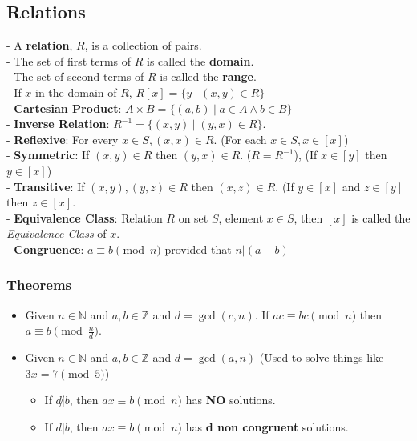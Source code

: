 \documentclass{article}
\newcommand\setbar{\hspace{3pt} \big| \hspace{3pt}}
\begin{document}
\begin{multicols}{3}
  \subsection*{Relations}
  - A \textbf{relation}, $R$, is a collection of pairs.\\
  - The set of first terms of $R$ is called the \textbf{domain}.\\
  - The set of second terms of $R$ is called the \textbf{range}.\\
  - If $x$ in the domain of $R$, $R[x] = \{y \setbar (x,y) \in R\}$\\
  - \textbf{Cartesian Product}: $A \times B = \{(a,b) \setbar a \in A \wedge b \in B\}$\\
  - \textbf{Inverse Relation}: $R^{-1} = \{(x,y) \setbar (y,x) \in R\}$.\\
  - \textbf{Reflexive}: For every $x \in S, (x,x) \in R$. (For each $x\in S, x \in [x]$)\\
  - \textbf{Symmetric}: If $(x,y) \in R$ then $(y,x) \in R$. ($R = R^{-1}$), (If $x \in [y]$ then $y \in [x]$)\\
  - \textbf{Transitive}: If $(x,y),(y,z) \in R$ then $(x,z) \in R$. (If $y \in [x]$ and $z \in [y]$ then $z \in [x]$.\\
  - \textbf{Equivalence Class}: Relation $R$ on set $S$, element $x \in S$, then $[x]$ is called the \textit{Equivalence Class} of $x$.\\
  - \textbf{Congruence}: $a \equiv b \pmod n$ provided that $n|(a - b)$\\
  \subsubsection*{Theorems}
  \begin{itemize}
  \item Given $n \in \mathbb N$ and $a,b \in \mathbb Z$ and $d = \gcd(c,n)$. If $ac \equiv bc \pmod{n}$ then $a \equiv b \pmod{\frac{n}{d}}$.
  \item Given $n \in \mathbb N$ and $a,b \in \mathbb Z$ and $d = \gcd(a,n)$ (Used to solve things like $3x = 7 \pmod 5$)
  \begin{itemize}
  \item If $d \not | b$, then $ax \equiv b \pmod{n}$ has \textbf{NO} solutions.
  \item If $d|b$, then $ax \equiv b \pmod{n}$ has \textbf{d non congruent} solutions.
  \end{itemize}
\end{itemize}

\end{multicols}
\end{document}
